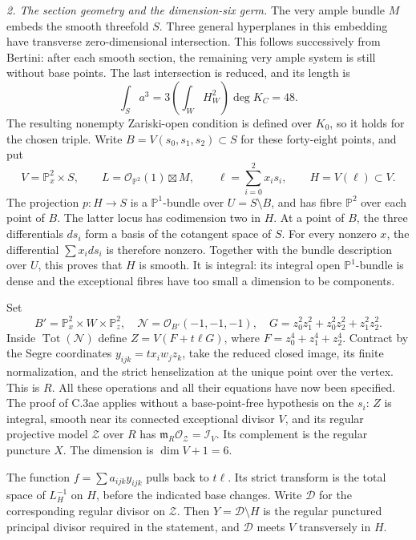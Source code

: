 \emph{2. The section geometry and the dimension-six germ.}
The very ample bundle $M$ embeds the smooth threefold
$S$. Three general hyperplanes in this embedding have
transverse zero-dimensional intersection. This follows
successively from Bertini: after each smooth section,
the remaining very ample system is still without base
points. The last intersection is reduced, and its length is
\[
                        \int_S a^3
              =3\left(\int_W H_W^2\right)\deg K_C=48.
\]
The resulting nonempty Zariski-open condition is
defined over $K_0$, so it holds for the chosen triple.
Write $B=V(s_0,s_1,s_2)\subset S$ for these forty-eight
points, and put
\[
 V=\mathbb P^2_x\times S,\qquad
 L=\mathcal O_{\mathbb P^2}(1)\boxtimes M,
 \qquad \ell=\sum_{i=0}^2 x_i s_i,
 \qquad H=V(\ell)\subset V.
\]
The projection $p:H\to S$ is a $\mathbb P^1$-bundle
over $U=S\setminus B$, and has fibre $\mathbb P^2$
over each point of $B$. The latter locus has codimension
two in $H$. At a point of $B$, the three differentials
$ds_i$ form a basis of the cotangent space of $S$.
For every nonzero $x$, the differential
$\sum x_i ds_i$ is therefore nonzero. Together with
the bundle description over $U$, this proves that
$H$ is smooth. It is integral: its integral open
$\mathbb P^1$-bundle is dense and the exceptional
fibres have too small a dimension to be components.

Set
\[
 B'=\mathbb P^2_x\times W\times\mathbb P^2_z,
 \quad\mathcal N=\mathcal O_{B'}(-1,-1,-1),\quad
 G=z_0^2z_1^2+z_0^2z_2^2+z_1^2z_2^2.
\]
Inside $\operatorname{Tot}(\mathcal N)$ define
$Z=V(F+t\ell G)$, where $F=z_0^4+z_1^4+z_2^4$.
Contract by the Segre coordinates $y_{ijk}=tx_iw_jz_k$,
take the reduced closed image, its finite normalization,
and the strict henselization at the unique point over
the vertex. This is $R$. All these operations and all
their equations have now been specified. The proof of
C.3ae applies without a base-point-free hypothesis on
the $s_i$: $Z$ is integral, smooth near its connected
exceptional divisor $V$, and its regular projective
model $\mathcal Z$ over $R$ has
$\mathfrak m_R\mathcal O_{\mathcal Z}=\mathcal I_V$.
Its complement is the regular puncture $X$.
The dimension is $\dim V+1=6$.

The function $f=\sum a_{ijk}y_{ijk}$ pulls back to
$t\ell$. Its strict transform is the total space of
$L_H^{-1}$ on $H$, before the indicated base changes.
Write $\mathcal D$ for the corresponding regular
divisor on $\mathcal Z$. Then
$Y=\mathcal D\setminus H$ is the regular punctured
principal divisor required in the statement, and
$\mathcal D$ meets $V$ transversely in $H$.


